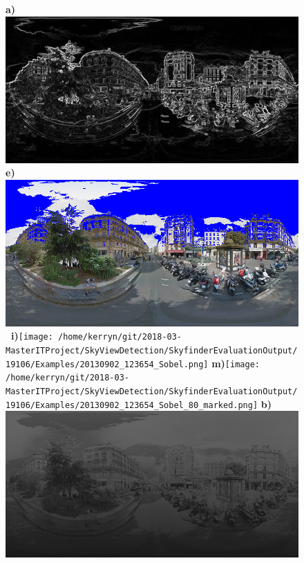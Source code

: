 \documentclass{article}
\begin{document}
\begin{figure}
\centering    
\textbf{\scriptsize{a)}}\includegraphics[scale=0.13]{Images/2/panorama-JtVHmEl7WCiz1xJ0bcJpBg-1_Sobel.png} %
\textbf{\scriptsize{e)}}\includegraphics[scale=0.13]{Images/2/panorama-JtVHmEl7WCiz1xJ0bcJpBg-1_Sobel_80_marked.png}%
\textbf{\scriptsize{~i)}}\texttt{[image: /home/kerryn/git/2018-03-MasterITProject/SkyViewDetection/SkyfinderEvaluationOutput/19106/Examples/20130902\_123654\_Sobel.png]} %
\textbf{\scriptsize{m)}}\texttt{[image: /home/kerryn/git/2018-03-MasterITProject/SkyViewDetection/SkyfinderEvaluationOutput/19106/Examples/20130902\_123654\_Sobel\_80\_marked.png]} 
\textbf{\scriptsize{b)}}\includegraphics[scale=0.13]{Images/2/panorama-JtVHmEl7WCiz1xJ0bcJpBg-1_Sobel_prob.png} %

\end{figure}
\end{document}
